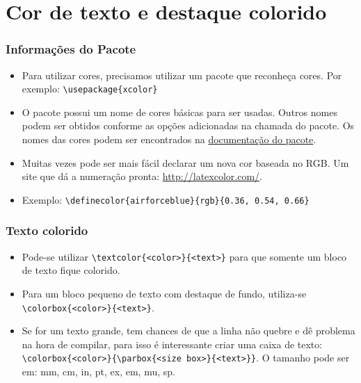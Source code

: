 \documentclass{beamer}
\begin{document}
\section{Cor de texto e destaque colorido}
\begin{frame}[fragile]
    \frametitle{Informações do Pacote}

    \begin{itemize}
        \item Para utilizar cores, precisamos utilizar um pacote que reconheça cores. Por exemplo: \lstinline[style=myStyleLatex]!\usepackage{xcolor}!
        \item O pacote possui um nome de cores básicas para ser usadas. Outros nomes podem ser obtidos conforme as opções adicionadas na chamada do pacote. Os nomes das cores podem ser encontrados na \href{https://ctan.dcc.uchile.cl/macros/latex/contrib/xcolor/xcolor.pdf}{documentação do pacote}.
        \item Muitas vezes pode ser mais fácil declarar um nova cor baseada no RGB. Um site que dá a numeração pronta: \url{http://latexcolor.com/}.
        \item Exemplo: \lstinline[style=myStyleLatex]!\definecolor{airforceblue}{rgb}{0.36, 0.54, 0.66}!
    \end{itemize}

\end{frame}

\begin{frame}[fragile]
    \frametitle{Texto colorido}

    \begin{itemize}
        \item Pode-se utilizar \lstinline[style=myStyleLatex]!\textcolor{<color>}{<text>}! para que somente um bloco de texto fique colorido.
        \item Para um bloco pequeno de texto com destaque de fundo, utiliza-se \lstinline[style=myStyleLatex]!\colorbox{<color>}{<text>}!.
        \item Se for um texto grande, tem chances de que a linha não quebre e dê problema na hora de compilar, para isso é interessante criar uma caixa de texto: \lstinline[style=myStyleLatex]!\colorbox{<color>}{\parbox{<size box>}{<text>}}!. O tamanho pode ser em: mm, cm, in, pt, ex, em, mu, sp.
    \end{itemize}  

\end{frame}
\end{document}
